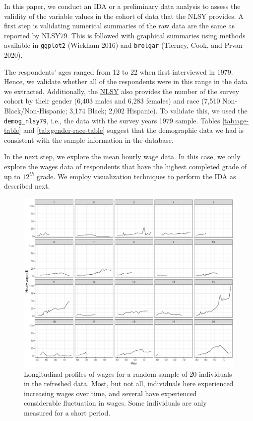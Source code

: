 \documentclass{article}
\begin{document}
In this paper, we conduct an IDA or a preliminary data analysis to assess the validity of the variable values in the cohort of data that the NLSY provides. A first step is validating numerical summaries of the raw data are the same as reported by NLSY79. This is followed with graphical summaries using methods available in \texttt{ggplot2} (Wickham 2016) and \texttt{brolgar} (Tierney, Cook, and Prvan 2020).

The respondents' ages ranged from 12 to 22 when first interviewed in 1979. Hence, we validate whether all of the respondents were in this range in the data we extracted. Additionally, the \href{https://www.nlsinfo.org/content/cohorts/nlsy79/intro-to-the-sample/nlsy79-sample-introduction}{NLSY} also provides the number of the survey cohort by their gender (6,403 males and 6,283 females) and race (7,510 Non-Black/Non-Hispanic; 3,174 Black; 2,002 Hispanic). To validate this, we used the \texttt{demog\_nlsy79}, i.e., the data with the survey years 1979 sample. Tables \ref{tab:age-table} and \ref{tab:gender-race-table} suggest that the demographic data we had is consistent with the sample information in the database.

In the next step, we explore the mean hourly wage data. In this case, we only explore the wages data of respondents that have the highest completed grade of up to \(12^{th}\) grade. We employ visualization techniques to perform the IDA as described next.

\begin{figure}

{\centering \includegraphics[width=1\linewidth]{figures/sample-plot-1} 

}

\caption{Longitudinal profiles of wages for a random sample of 20 individuals in the refreshed data. Most, but not all, individuals here experienced increasing wages over time, and several have experienced considerable fluctuation in wages. Some individuals are only measured for a short period.}\label{fig:sample-plot}
\end{figure}
\end{document}
